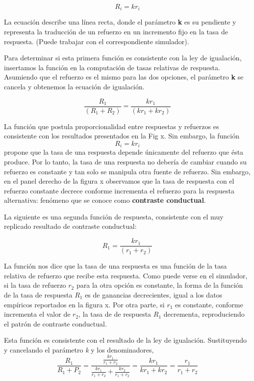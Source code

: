 \documentclass[
  letterpaper,
]{book}
\begin{document}
\[R_i = kr_i\]

La ecuación describe una línea recta, donde el parámetro \textbf{k} es
su pendiente y representa la traducción de un refuerzo en un incremento
fijo en la tasa de respuesta. (Puede trabajar con el correspondiente
simulador).

Para determinar si esta primera función es consistente con la ley de
igualación, insertamos la función en la computación de tasas relativas
de respuesta. Asumiendo que el refuerzo es el mismo para las dos
opciones, el parámetro \textbf{k} se cancela y obtenemos la ecuación de
igualación.

\[\frac {R_1} {(R_1 + R_2)} = \frac {kr_1} {(kr_1 + kr_2)}\]

La función que postula proporcionalidad entre respuestas y refuerzos es
consistente con los resultados presentados en la Fig x. Sin embargo, la
función \[R_i = kr_i\] propone que la tasa de una respuesta depende
únicamente del refuerzo que ésta produce. Por lo tanto, la tasa de una
respuesta no debería de cambiar cuando su refuerzo es constante y tan
solo se manipula otra fuente de refuerzo. Sin embargo, en el panel
derecho de la figura x observamos que la tasa de respuesta con el
refuerzo constante decrece conforme incrementa el refuerzo para la
respuesta alternativa: fenómeno que se conoce como \textbf{contraste
conductual}.

La siguiente es una segunda función de respuesta, consistente con el muy
replicado resultado de contraste conductual:

\[R_1 = \frac {kr_1} {(r_1 + r_2)}\]

La función nos dice que la tasa de una respuesta es una función de la
tasa relativa de refuerzo que recibe esta respuesta. Como puede verse en
el simulador, si la tasa de refuerzo \(r_2\) para la otra opción es
constante, la forma de la función de la tasa de respuesta \(R_1\) es de
ganancias decrecientes, igual a los datos empíricos reportados en la
figura x. Por otra parte, si \(r_1\) es constante, conforme incrementa
el valor de \(r_2\), la tasa de de respuesta \(R_1\) decrementa,
reproduciendo el patrón de contraste conductual.

Esta función es consistente con el resultado de la ley de igualación.
Sustituyendo y cancelando el parámetro \emph{k} y los denominadores,
\begin{equation}
\frac{R_1}{R_1 + P_2} = \frac{\frac{kr_1}{r_1 + r_2}}{\frac{kr_1}{r_1 + r_2} + \frac{kr_2}{r_1 + r_2}} = \frac{kr_1}{kr_1 + kr_2} = \frac{r_1}{r_1 + r_2}
\end{equation}
\end{document}
